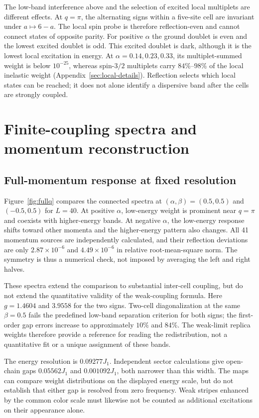The low-band interference above and the selection of excited local multiplets
are different effects.
At $q=\pi$, the alternating signs within a five-site cell are invariant under
$a\mapsto6-a$. The local spin probe is therefore reflection-even and cannot
connect states of opposite parity.
For positive $\alpha$ the ground doublet is even and the lowest excited
doublet is odd. This excited doublet is dark, although it is the lowest local
excitation in energy.
At $\alpha=0.14,0.23,0.33$, its multiplet-summed weight is below $10^{-25}$,
whereas spin-$3/2$ multiplets carry $84\%$--$98\%$ of the local inelastic
weight (Appendix~\ref{sec:local-details}).
Reflection selects which local states can be reached; it does not alone
identify a dispersive band after the cells are strongly coupled.

\section{Finite-coupling spectra and momentum reconstruction}
\label{sec:dynamics}

\subsection{Full-momentum response at fixed resolution}

Figure~\ref{fig:fullq} compares the connected spectra at
$(\alpha,\beta)=(0.5,0.5)$ and $(-0.5,0.5)$ for $L=40$.
At positive $\alpha$, low-energy weight is prominent near $q=\pi$ and coexists
with higher-energy bands. At negative $\alpha$, the low-energy response shifts
toward other momenta and the higher-energy pattern also changes.
All 41 momentum sources are independently calculated, and their reflection
deviations are only $2.87\times10^{-6}$ and $4.49\times10^{-6}$ in relative
root-mean-square norm. The symmetry is thus a numerical check, not imposed
by averaging the left and right halves.

These spectra extend the comparison to substantial inter-cell coupling, but
do not extend the quantitative validity of the weak-coupling formula.
Here $g=1.4604$ and $3.9558$ for the two signs.
Two-cell diagonalization at the same $\beta=0.5$ fails the predefined
low-band separation criterion for both signs; the first-order gap errors
increase to approximately $10\%$ and $84\%$.
The weak-limit replica weights therefore provide a reference for reading the
redistribution, not a quantitative fit or a unique assignment of these bands.

The energy resolution is $0.09277J_1$.
Independent sector calculations give open-chain gaps $0.05562J_1$ and
$0.001092J_1$, both narrower than this width.
The maps can compare weight distributions on the displayed energy scale,
but do not establish that either gap is resolved from zero frequency.
Weak stripes enhanced by the common color scale must likewise not be counted
as additional excitations on their appearance alone.

